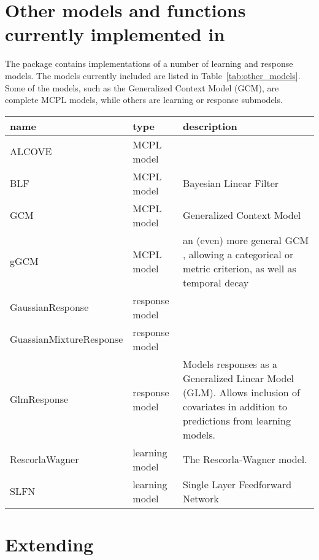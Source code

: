 \documentclass[doc]{apa}
\newcommand{\code}[1]{{\ttfamily{#1}}}
\begin{document}
\section{Other models and functions currently implemented in \code{mcplR}}

The package contains implementations of a number of learning and response models. The models currently included are listed in Table~\ref{tab:other_models}. Some of the models, such as the Generalized Context Model (GCM), are complete MCPL models, while others are learning or response submodels.

\begin{table}
\begin{tabular}{lll} \hline
name & type & description \\ \hline
ALCOVE & MCPL model & \\
BLF & MCPL model & Bayesian Linear Filter \cite{Speekenbrink10} \\
GCM  & MCPL model & Generalized Context Model \cite{Nosofsky86} \\
gGCM & MCPL model & an (even) more general GCM  \cite{Speekenbrink10}, allowing a categorical or metric criterion, as well as temporal decay \\
GaussianResponse & response model & \\
GuassianMixtureResponse & response model & \\
GlmResponse & response model & Models responses as a Generalized Linear Model (GLM). Allows inclusion of covariates in addition to predictions from learning models. \\
RescorlaWagner & learning model & The Rescorla-Wagner model. \\
SLFN & learning model & Single Layer Feedforward Network \\ \hline
\end{tabular}
\end{table}





\section{Extending \code{mcplR}}
\end{document}

